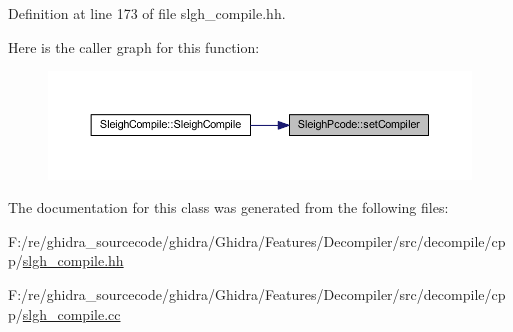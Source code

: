 Definition at line 173 of file slgh\+\_\+compile.\+hh.

Here is the caller graph for this function\+:
\nopagebreak
\begin{figure}[H]
\begin{center}
\leavevmode
\includegraphics[width=350pt]{class_sleigh_pcode_a885a81e5b9203ddfb7105c96ca97ef03_icgraph}
\end{center}
\end{figure}


The documentation for this class was generated from the following files\+:\begin{DoxyCompactItemize}
\item 
F\+:/re/ghidra\+\_\+sourcecode/ghidra/\+Ghidra/\+Features/\+Decompiler/src/decompile/cpp/\mbox{\hyperlink{slgh__compile_8hh}{slgh\+\_\+compile.\+hh}}\item 
F\+:/re/ghidra\+\_\+sourcecode/ghidra/\+Ghidra/\+Features/\+Decompiler/src/decompile/cpp/\mbox{\hyperlink{slgh__compile_8cc}{slgh\+\_\+compile.\+cc}}\end{DoxyCompactItemize}
